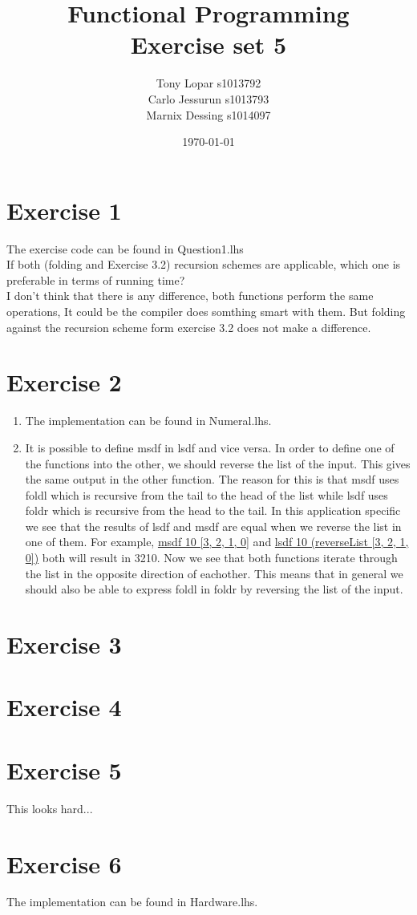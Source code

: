 \documentclass{article}
\begin{document}
\title{Functional Programming \\ Exercise set 5}
\date{\today}
\author{Tony Lopar s1013792 \\ Carlo Jessurun s1013793 \\ Marnix Dessing s1014097}
\maketitle

\section*{Exercise 1}
The exercise code can be found in Question1.lhs\\
If both (folding and Exercise 3.2) recursion schemes are applicable,
which one is preferable in terms of running time?\\
I don't think that there is any difference, both functions perform the same operations,
It could be the compiler does somthing smart with them. But folding against the
recursion scheme form exercise 3.2 does not make a difference.

\section*{Exercise 2}
\begin{enumerate}
  \item The implementation can be found in Numeral.lhs.
  \item It is possible to define msdf in lsdf and vice versa. In order to define one of the functions into the other, we should reverse the list of the input. This gives the same output in the other function. The reason for this is that msdf uses foldl which is recursive from the tail to the head of the list while lsdf uses foldr which is recursive from the head to the tail. In this application specific we see that the results of lsdf and msdf are equal when we reverse the list in one of them. For example, \underline{msdf 10 [3, 2, 1, 0]} and \underline{lsdf 10 (reverseList [3, 2, 1, 0])} both will result in 3210.
   Now we see that both functions iterate through the list in the opposite direction of eachother. This means that in general we should also be able to express foldl in foldr by reversing the list of the input.
\end{enumerate}
\section*{Exercise 3}
\section*{Exercise 4}
\section*{Exercise 5}
This looks hard...
\section*{Exercise 6}
The implementation can be found in Hardware.lhs.
\end{document}
